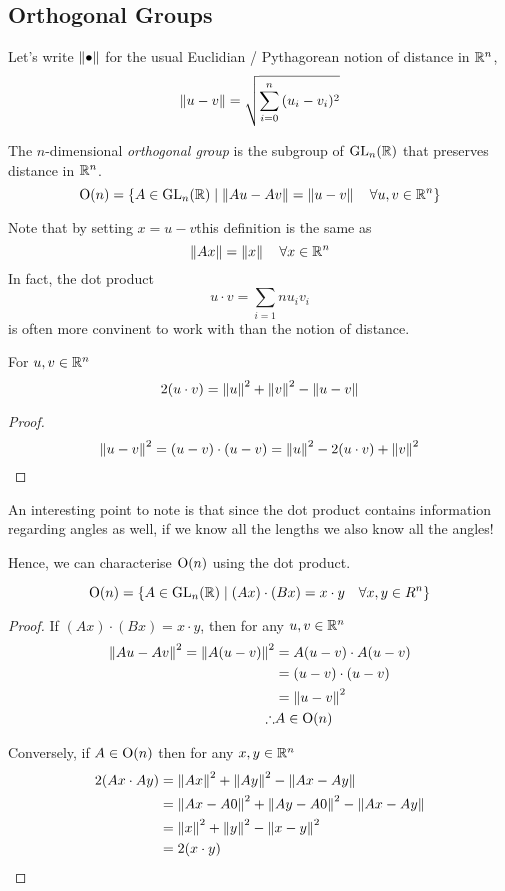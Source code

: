 \documentclass{article}
\begin{document}
\subsection{Orthogonal Groups}
Let's write $\left\lVert \bullet\right\rVert$ for the usual Euclidian / Pythagorean notion of distance in $\mathbb{R}^n$,
\[
    \left\lVert u - v\right\rVert = \sqrt{\sum_{i=0}^{n}{(u_i - v_i)^2}}
\]
\begin{defi}
    The $n$-dimensional \emph{orthogonal group} is the subgroup of $\mathrm{GL}_n(\mathbb{R})$ that preserves distance in $\mathbb{R}^n$.
    \[
        \mathrm{O}(n) = \{A \in \mathrm{GL}_n(\mathbb{R}) \mid \left\lVert Au - Av\right\rVert = \left\lVert u - v\right\rVert \quad \forall u, v \in \mathbb{R}^n\}  
    \]
\end{defi}
\begin{remark}
    Note that by setting $x = u - v$this definition is the same as 
    \[
        \left\lVert Ax\right\rVert = \left\lVert x\right\rVert \quad \forall x \in \mathbb{R}^n
    \]
    In fact, the dot product
    \[
        u \cdot v = \sum_{i=1}{n}{u_iv_i}
    \]
    is often more convinent to work with than the notion of distance.
\end{remark}

\begin{lemma}
    For $u, v \in \mathbb{R}^n$
    \[
        2(u \cdot v) = \left\lVert u\right\rVert^2 + \left\lVert v\right\rVert^2 - \left\lVert u - v\right\rVert
    \]
\end{lemma}
\begin{proof}
    \[
        \left\lVert u - v\right\rVert^2 = (u - v) \cdot (u - v) = \left\lVert u\right\rVert^2 - 2(u \cdot v) + \left\lVert v\right\rVert^2  
    \]
\end{proof}
An interesting point to note is that since the dot product contains information regarding angles as well, if we know all the lengths we also know all the angles!

Hence, we can characterise $\mathrm{O}(n)$ using the dot product.
\begin{lemma}
    \[
        \mathrm{O}(n) = \left\{ A \in \mathrm{GL}_n(\mathbb{R}) \mid (Ax) \cdot (Bx) = x \cdot y \quad \forall x, y \in R^n \right\}    
    \]
\end{lemma}
\begin{proof}
    If $(Ax) \cdot (Bx) = x \cdot y$, then for any $u, v \in \mathbb{R}^n$
    \begin{align*}
        \left\lVert Au - Av\right\rVert^2 = \left\lVert A(u-v)\right\rVert^2 &= A(u-v) \cdot A(u-v) \\
        &= (u-v) \cdot (u-v) \\
        &= \left\lVert u - v\right\rVert^2 \\
        \therefore & A \in \mathrm{O}(n)
    \end{align*}

    Conversely, if $A \in \mathrm{O}(n)$ then for any $x, y \in \mathbb{R}^n$
    \begin{align*}
        2 (Ax \cdot Ay) &= \left\lVert Ax\right\rVert^2 + \left\lVert Ay\right\rVert^2 - \left\lVert Ax - Ay\right\rVert \\
        &= \left\lVert Ax - A0\right\rVert^2 + \left\lVert Ay- A0\right\rVert^2 - \left\lVert Ax - Ay\right\rVert \\
        &= \left\lVert x\right\rVert^2 + \left\lVert y\right\rVert^2 - \left\lVert x - y\right\rVert^2 \\
        &= 2 (x \cdot y)
    \end{align*}
\end{proof}
\end{document}
